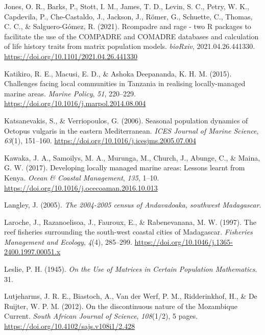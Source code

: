 \documentclass[
]{article}
\newlength{\cslhangindent}
\newlength{\cslentryspacingunit} %
\newenvironment{CSLReferences}[2] %
 {%
  \setlength{\parindent}{0pt}
  \ifodd #1
  \let\oldpar\par
  \def\par{\hangindent=\cslhangindent\oldpar}
  \fi
  \setlength{\parskip}{#2\cslentryspacingunit}
 }%
 {}
\begin{document}
\begin{CSLReferences}{1}{2}
\leavevmode{}%
Jones, O. R., Barks, P., Stott, I. M., James, T. D., Levin, S. C., Petry, W. K., Capdevila, P., Che-Castaldo, J., Jackson, J., Römer, G., Schuette, C., Thomas, C. C., \& Salguero-Gómez, R. (2021). Rcompadre and rage - two {R} packages to facilitate the use of the {COMPADRE} and {COMADRE} databases and calculation of life history traits from matrix population models. \emph{bioRxiv}, 2021.04.26.441330. \url{https://doi.org/10.1101/2021.04.26.441330}

\leavevmode{}%
Katikiro, R. E., Macusi, E. D., \& Ashoka Deepananda, K. H. M. (2015). Challenges facing local communities in {Tanzania} in realising locally-managed marine areas. \emph{Marine Policy}, \emph{51}, 220--229. \url{https://doi.org/10.1016/j.marpol.2014.08.004}

\leavevmode{}%
Katsanevakis, S., \& Verriopoulos, G. (2006). Seasonal population dynamics of {Octopus} vulgaris in the eastern {Mediterranean}. \emph{ICES Journal of Marine Science}, \emph{63}(1), 151--160. \url{https://doi.org/10.1016/j.icesjms.2005.07.004}

\leavevmode{}%
Kawaka, J. A., Samoilys, M. A., Murunga, M., Church, J., Abunge, C., \& Maina, G. W. (2017). Developing locally managed marine areas: {Lessons} learnt from {Kenya}. \emph{Ocean \& Coastal Management}, \emph{135}, 1--10. \url{https://doi.org/10.1016/j.ocecoaman.2016.10.013}

\leavevmode{}%
Langley, J. (2005). \emph{The 2004-2005 census of {Andavadoaka}, southwest {Madagascar}}.

\leavevmode{}%
Laroche, J., Razanoelisoa, J., Fauroux, E., \& Rabenevanana, M. W. (1997). The reef fisheries surrounding the south-west coastal cities of {Madagascar}. \emph{Fisheries Management and Ecology}, \emph{4}(4), 285--299. \url{https://doi.org/10.1046/j.1365-2400.1997.00051.x}

\leavevmode{}%
Leslie, P. H. (1945). \emph{On the {Use} of {Matrices} in {Certain Population Mathematics}}. 31.

\leavevmode{}%
Lutjeharms, J. R. E., Biastoch, A., Van der Werf, P. M., Ridderinkhof, H., \& De Ruijter, W. P. M. (2012). On the discontinuous nature of the {Mozambique Current}. \emph{South African Journal of Science}, \emph{108}(1/2), 5 pages. \url{https://doi.org/10.4102/sajs.v108i1/2.428}


\end{CSLReferences}
\end{document}
